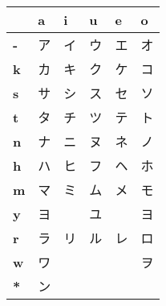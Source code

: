 


\bigskip
\begin{center}
\Huge


\begin{tabular}{m{1.0cm}||m{1.0cm}|m{1.0cm}|m{1.0cm}|m{1.0cm}|m{1.0cm}|}
& \textbf{a}& \textbf{i}& \textbf{u}& \textbf{e}& \textbf{o}\\ \hline \hline
\textbf{-}&\smallskip ア&\smallskip イ&\smallskip ウ&\smallskip エ&\smallskip オ\\ \hline
\textbf{k}&\smallskip カ&\smallskip キ&\smallskip ク&\smallskip ケ&\smallskip コ\\ \hline
\textbf{s}&\smallskip サ&\smallskip シ&\smallskip ス&\smallskip セ&\smallskip ソ\\ \hline
\textbf{t}&\smallskip タ&\smallskip チ&\smallskip ツ&\smallskip テ&\smallskip ト\\ \hline
\textbf{n}&\smallskip ナ&\smallskip ニ&\smallskip ヌ&\smallskip ネ&\smallskip ノ\\ \hline
\textbf{h}&\smallskip ハ&\smallskip ヒ&\smallskip フ&\smallskip ヘ&\smallskip ホ\\ \hline
\textbf{m}&\smallskip マ&\smallskip ミ&\smallskip ム&\smallskip メ&\smallskip モ\\ \hline
\textbf{y}&\smallskip ヨ&\smallskip   &\smallskip ユ&\smallskip   &\smallskip ヨ\\ \hline
\textbf{r}&\smallskip ラ&\smallskip リ&\smallskip ル&\smallskip レ&\smallskip ロ\\ \hline
\textbf{w}&\smallskip ワ&\smallskip   &\smallskip   &\smallskip   &\smallskip ヲ\\ \hline
\textbf{*}&\smallskip ン&\smallskip   &\smallskip   &\smallskip   &\smallskip   \\ \hline
\end{tabular}
\end{center}
